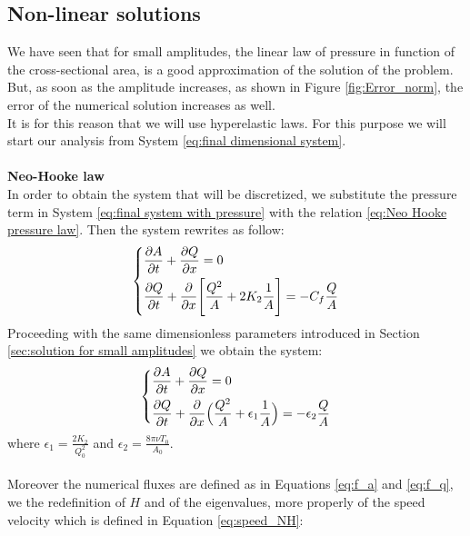 \documentclass[12pt,a4paper]{article}
\numberwithin{equation}{section}
\begin{document}
\subsection{Non-linear solutions}
We have seen that for small amplitudes, the linear law of pressure in function of the cross-sectional area, is a good approximation of the solution of the problem. But, as soon as the amplitude increases, as shown in Figure \ref{fig:Error_norm}, the error of the numerical solution increases as well.\\
It is for this reason that we will use hyperelastic laws. For this purpose we will start our analysis from System \ref{eq:final dimensional system}.\\
\\
{\bf Neo-Hooke law}\\
In order to obtain the system that will be discretized, we substitute the pressure term in System \ref{eq:final system with pressure} with the relation  \ref{eq:Neo Hooke pressure law}. Then the system rewrites as follow:
\begin{equation}
  \left\{
      \begin{aligned}
       & \frac{\partial A}{\partial t} + \frac{\partial Q}{\partial x} = 0\\
       &  \frac{\partial Q}{\partial t} +\frac{\partial}{\partial x}\Bigg[\frac{Q^2}{A}+2K_2{1 \over A}\Bigg] = -C_f \frac{Q}{A} \\
      \end{aligned}
    \right.
\end{equation}
Proceeding with the same dimensionless parameters introduced in Section \ref{sec:solution for small amplitudes} we obtain the system:
\begin{equation}\label{adim-system NH}
  \left\{
      \begin{aligned}
       & \frac{\partial A}{\partial t} + \frac{\partial Q}{\partial x} = 0\\
       & \frac{\partial Q}{\partial t} + \frac{\partial}{\partial x} \Big(\frac{Q^2}{A} + \epsilon_1 {1 \over A}\Big) = -\epsilon_2 \frac{Q}{A}
      \end{aligned}
    \right.
\end{equation}
where $\epsilon_1 = \frac{2 K_2}{Q_0^2}$ and $\epsilon_2 = \frac{8\pi \nu T_0}{A_0}$.\\
\\
Moreover the numerical fluxes are defined as in Equations \ref{eq:f_a} and \ref{eq:f_q}, we the redefinition of $H$ and of the eigenvalues, more properly of the speed velocity which is defined in Equation \ref{eq:speed_NH}:
\end{document}
